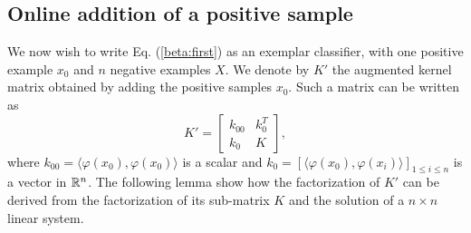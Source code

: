 \subsection{Online addition of a positive sample}
\label{subsec:adding}
We now wish to write Eq. (\ref{beta:first}) as an exemplar classifier, with one positive example $x_0$ and $n$ negative examples $X$.
We denote by $K'$ the augmented kernel matrix obtained by adding the positive samples $x_0$. Such a matrix can be written as
\begin{equation}
K' = \begin{bmatrix}
k_{00} & k_0^T\\
k_0 & K
\end{bmatrix},
\end{equation}
where $k_{00}=\langle \varphi(x_0),\varphi(x_0)\rangle$ is a scalar and $k_0= [\langle \varphi(x_0),\varphi(x_i)\rangle]_{1\le i\le n}$ is a vector in $\mathbb R^n$. 
The following lemma show how the factorization of $K'$ can be derived from the factorization of its sub-matrix $K$ and the solution of a $n\times n$ linear system.

